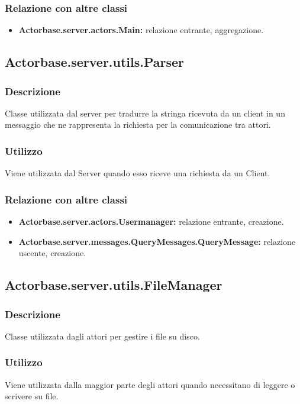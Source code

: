 \documentclass[a4paper]{article}
\begin{document}
			\subsubsection{Relazione con altre classi}
				\begin{itemize}
					\item \textbf{Actorbase.server.actors.Main:} relazione entrante, aggregazione.
				\end{itemize}
			
		\subsection{Actorbase.server.utils.Parser}
			\subsubsection{Descrizione}
				Classe utilizzata dal server per tradurre la stringa ricevuta da un client in un messaggio che ne rappresenta la richiesta per la 
				comunicazione tra attori.
				
			\subsubsection{Utilizzo}
				Viene utilizzata dal Server quando esso riceve una richiesta da un Client.
				
			\subsubsection{Relazione con altre classi}
			\begin{itemize}
				\item \textbf{Actorbase.server.actors.Usermanager:} relazione entrante, creazione.
				\item \textbf{Actorbase.server.messages.QueryMessages.QueryMessage:} relazione uscente, creazione. 
			\end{itemize}
		
		\subsection{Actorbase.server.utils.FileManager}
			\subsubsection{Descrizione}
				Classe utilizzata dagli attori per gestire i file su disco.
				
			\subsubsection{Utilizzo}
				Viene utilizzata dalla maggior parte degli attori quando necessitano di leggere o scrivere su file.
				
\end{document}
